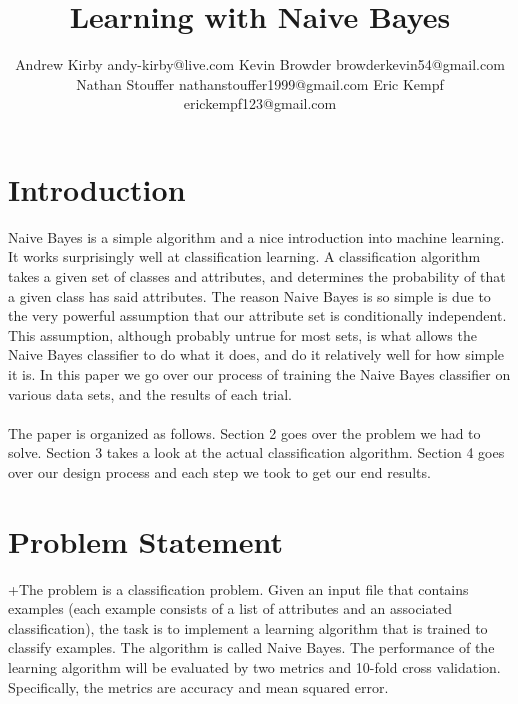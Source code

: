 \documentclass[twoside,11pt]{article}
\begin{document}
\title{Learning with Naive Bayes}

\author{\name Andrew Kirby \email andy-kirby@live.com \AND
		\name Kevin Browder \email browderkevin54@gmail.com \AND
		\name Nathan Stouffer \email nathanstouffer1999@gmail.com \AND
		\name Eric Kempf \email erickempf123@gmail.com }

\editor{}

	
\maketitle

\begin{abstract}
	
\end{abstract}

\begin{keywords}
\end{keywords}

\section{Introduction}

Naive Bayes is a simple algorithm and a nice introduction into machine learning. It works surprisingly well at classification learning. A classification algorithm takes a given set of classes and attributes, and determines the probability of that a given class has said attributes. The reason Naive Bayes is so simple is due to the very powerful assumption that our attribute set is conditionally independent. This assumption, although probably untrue for most sets, is what allows the Naive Bayes classifier to do what it does, and do it relatively well for how simple it is. In this paper we go over our process of training the Naive Bayes classifier on various data sets, and the results of each trial. \\\\
The paper is organized as follows. Section 2 goes over the problem we had to solve. Section 3 takes a look at the actual classification algorithm. Section 4 goes over our design process and each step we took to get our end results.

\section{Problem Statement}

+The problem is a classification problem. Given an input file that contains examples (each example consists of a list of attributes and an associated classification), the task is to implement a learning algorithm that is trained to classify examples. The algorithm is called Naive Bayes. The performance of the learning algorithm will be evaluated by two metrics and 10-fold cross validation. Specifically, the metrics are accuracy and mean squared error. 
\end{document}
